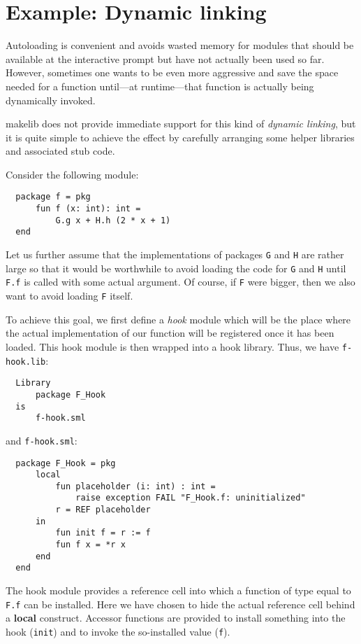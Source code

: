
\section{Example: Dynamic linking}
\label{sec:dynlink}

Autoloading is convenient and avoids wasted memory for modules that
should be available at the interactive prompt but have not actually
been used so far.  However, sometimes one wants to be even more
aggressive and save the space needed for a function until---at
runtime---that function is actually being dynamically invoked.

makelib does not provide immediate support for this kind of {\em dynamic
linking}, but it is quite simple to achieve the effect by carefully
arranging some helper libraries and associated stub code.

Consider the following module:
\begin{verbatim}
  package f = pkg
      fun f (x: int): int =
          G.g x + H.h (2 * x + 1)
  end
\end{verbatim}

Let us further assume that the implementations of packages {\tt G}
and {\tt H} are rather large so that it would be worthwhile to avoid
loading the code for {\tt G} and {\tt H} until {\tt F.f} is called
with some actual argument.  Of course, if {\tt F} were bigger, then we
also want to avoid loading {\tt F} itself.

To achieve this goal, we first define a {\em hook} module which will
be the place where the actual implementation of our function will be
registered once it has been loaded.  This hook module is then wrapped
into a hook library.  Thus, we have {\tt f-hook.lib}:
\begin{verbatim}
  Library
      package F_Hook
  is
      f-hook.sml
\end{verbatim}

and {\tt f-hook.sml}:

\begin{verbatim}
  package F_Hook = pkg
      local
          fun placeholder (i: int) : int =
              raise exception FAIL "F_Hook.f: uninitialized"
          r = REF placeholder
      in
          fun init f = r := f
          fun f x = *r x
      end
  end
\end{verbatim}

The hook module provides a reference cell into which a function of
type equal to {\tt F.f} can be installed.  Here we have chosen to hide
the actual reference cell behind a {\bf local} construct.  Accessor
functions are provided to install something into the hook
({\tt init}) and to invoke the so-installed value ({\tt f}).

